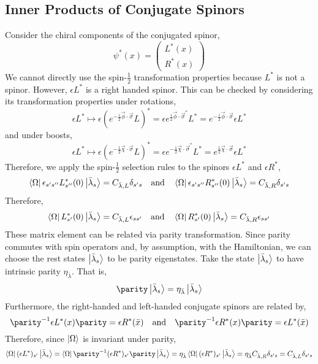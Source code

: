 \documentclass[12pt]{article}
\begin{document}
\subsection{Inner Products of Conjugate Spinors}
Consider the chiral components of the conjugated spinor,
\[ \psi^*(x) = 
\begin{pmatrix}
L^*(x) \\
R^*(x)
\end{pmatrix} \]
We cannot directly use the spin-$\tfrac{1}{2}$ transformation properties because $L^*$ is not a spinor. However, $\epsilon L^*$ is a right handed spinor. This can be checked by considering its transformation properties under rotations,
\[ \epsilon L^* \mapsto \epsilon \left( e^{-\frac{i}{2} \vec{\phi} \cdot \vec{\sigma}} L \right)^* = \epsilon  e^{\frac{i}{2} \vec{\phi} \cdot \vec{\sigma}^*} L^* =  e^{- \frac{i}{2} \vec{\phi} \cdot \vec{\sigma}} \epsilon L^*\]
and under boosts,
\[ \epsilon L^* \mapsto \epsilon \left( e^{-\frac{1}{2} \vec{\chi} \cdot \vec{\sigma}} L \right)^* = \epsilon  e^{-\frac{1}{2} \vec{\chi} \cdot \vec{\sigma}^*} L^* =  e^{\frac{1}{2} \vec{\chi} \cdot \vec{\sigma}} \epsilon L^*\]
Therefore, we apply the spin-$\tfrac{1}{2}$ selection rules to the spinors $\epsilon L^*$ and $\epsilon R^*$,
\[ \left< \Omega \right| \epsilon_{s' s''} L^*_{s''}(0) \left| {\bar{\lambda}}_{s} \right> = C_{{\bar{\lambda}}, L} \delta_{s' s} \quad \text{and} \quad \left< \Omega \right| \epsilon_{s' s''} R^*_{s''}(0) \left| {\bar{\lambda}}_{s} \right> = C_{{\bar{\lambda}}, R} \delta_{s' s}\]
Therefore,
\[ \left< \Omega \right| L_{s'}^*(0) \left| {\bar{\lambda}}_{s} \right> = C_{{\bar{\lambda}}, L} \epsilon_{s s'} \quad \text{and} \quad \left< \Omega \right| R_{s'}^*(0) \left| {\bar{\lambda}}_{s} \right> = C_{{\bar{\lambda}}, R} \epsilon_{s s'}\]
These matrix element can be related via parity transformation. Since parity commutes with spin operators and, by assumption, with the Hamiltonian, we can choose the rest states $\left| {\bar{\lambda}}_s \right>$ to be parity eigenstates. Take the state $\left| {\bar{\lambda}}_s \right>$ to have intrinsic parity $\eta_{\bar{\lambda}}$. That is,
\[ \parity \ket{{\bar{\lambda}}_s} = \eta_{\bar{\lambda}} \ket{{\bar{\lambda}}_s} \]
Furthermore, the right-handed and left-handed conjugate spinors are related by,
\[ \parity^{-1} \epsilon L^*(x) \parity = \epsilon R^*(\bar{x}) \quad \text{and} \quad \parity^{-1} \epsilon R^*(x) \parity = \epsilon L^*(\bar{x}) \]
Therefore, since $\left| \Omega \right>$ is invariant under parity,
\[ \bra{\Omega} (\epsilon L^*)_{s'} \ket{{\bar{\lambda}}_{s}} = \bra{\Omega} \parity^{-1} (\epsilon R^*)_{s'} \parity  \ket{{\bar{\lambda}}_{s}} = \eta_{\bar{\lambda}} \bra{\Omega} (\epsilon R^*)_{s'} \ket{{\bar{\lambda}}_{s}} = \eta_{\bar{\lambda}} C_{{\bar{\lambda}}, R} \delta_{s's} = C_{{\bar{\lambda}}, L} \delta_{s's} \]
\end{document}
